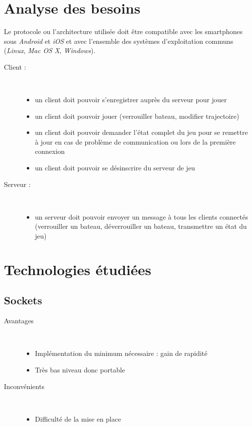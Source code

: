 \section{Analyse des besoins}
Le protocole ou l'architecture utilisée doit être compatible avec les smartphones sous \emph{Android} et \emph{iOS} et avec l'ensemble des systèmes d'exploitation communs (\emph{Linux}, \emph{Mac OS X}, \emph{Windows}).\\

\begin{description}
	\item[Client :]~
	\begin{itemize}
		\item un client doit pouvoir s'enregistrer auprès du serveur pour jouer
		\item un client doit pouvoir jouer (verrouiller bateau, modifier trajectoire)
		\item un client doit pouvoir demander l'état complet du jeu pour se remettre à jour en cas de problème de communication ou lors de la première connexion
		\item un client doit pouvoir se désinscrire du serveur de jeu
	\end{itemize}
	\item[Serveur :]~
	\begin{itemize}
		\item un serveur doit pouvoir envoyer un message à tous les clients connectés (verrouiller un bateau, déverrouiller un bateau, transmettre un état du jeu)
	\end{itemize}
\end{description}

\section{Technologies étudiées}
\subsection{Sockets}
\begin{description}
	\item[Avantages]~
	\begin{itemize}
		\item Implémentation du minimum nécessaire : gain de rapidité
		\item Très bas niveau donc portable
	\end{itemize}
	\item[Inconvénients]~
	\begin{itemize}
		\item Difficulté de la mise en place
	\end{itemize}
\end{description}

